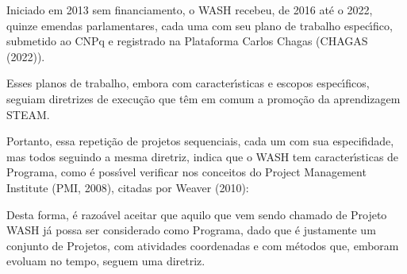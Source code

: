 \documentclass[
12pt,		%
openright,	%
twoside,  %
a4paper,			%
chapter=TITLE,		%
english,			%
french,				%
spanish,			%
brazil				%
]{USPSC-classe/USPSC}
\begin{document}
Iniciado em 2013 sem financiamento, o WASH recebeu, de 2016 at\'e o 2022, quinze emendas parlamentares, cada uma com seu plano de trabalho espec\'{\i}fico, submetido ao CNPq e registrado na Plataforma Carlos Chagas (CHAGAS (2022)).

















Esses planos de trabalho, embora com caracter\'{\i}sticas e escopos espec\'{\i}ficos, seguiam diretrizes de execu\c{c}\~ao que t\^em em comum a promo\c{c}\~ao da aprendizagem STEAM.

















Portanto, essa repeti\c{c}\~ao de projetos sequenciais, cada um com sua especifidade, mas todos seguindo a mesma diretriz, indica que o WASH tem caracter\'{\i}sticas de Programa, como \'e poss\'{\i}vel verificar nos conceitos do Project Management Institute  (PMI, 2008), citadas por  Weaver (2010):


















\noindent\begin{center}\mbox{\centering{}}\end{center}


Desta forma, \'e razo\'avel aceitar que aquilo que vem sendo chamado de Projeto WASH j\'a possa ser considerado como Programa, dado que \'e justamente um conjunto de Projetos, com atividades coordenadas e com m\'etodos que, emboram evoluam no tempo, seguem uma diretriz.
\end{document}
